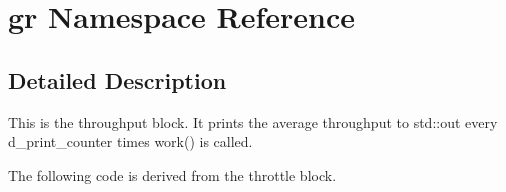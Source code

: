 \hypertarget{namespacegr}{\section{gr Namespace Reference}
\label{namespacegr}
}


\subsection{Detailed Description}
This is the throughput block. It prints the average throughput to std\+::out every d\+\_\+print\+\_\+counter times work() is called.

The following code is derived from the throttle block. 